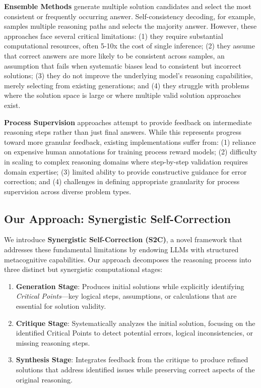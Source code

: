 \documentclass[10pt,twocolumn]{article}
\newcommand{\ssc}{\textsc{S2C}}
\begin{document}
\textbf{Ensemble Methods} generate multiple solution candidates and select the most consistent or frequently occurring answer. Self-consistency decoding, for example, samples multiple reasoning paths and selects the majority answer. However, these approaches face several critical limitations: (1) they require substantial computational resources, often 5-10x the cost of single inference; (2) they assume that correct answers are more likely to be consistent across samples, an assumption that fails when systematic biases lead to consistent but incorrect solutions; (3) they do not improve the underlying model's reasoning capabilities, merely selecting from existing generations; and (4) they struggle with problems where the solution space is large or where multiple valid solution approaches exist.

\textbf{Process Supervision} approaches attempt to provide feedback on intermediate reasoning steps rather than just final answers. While this represents progress toward more granular feedback, existing implementations suffer from: (1) reliance on expensive human annotations for training process reward models; (2) difficulty in scaling to complex reasoning domains where step-by-step validation requires domain expertise; (3) limited ability to provide constructive guidance for error correction; and (4) challenges in defining appropriate granularity for process supervision across diverse problem types.

\subsection{Our Approach: Synergistic Self-Correction}

We introduce \textbf{Synergistic Self-Correction (\ssc{})}, a novel framework that addresses these fundamental limitations by endowing LLMs with structured metacognitive capabilities. Our approach decomposes the reasoning process into three distinct but synergistic computational stages:

\begin{enumerate}
\item \textbf{Generation Stage}: Produces initial solutions while explicitly identifying \textit{Critical Points}—key logical steps, assumptions, or calculations that are essential for solution validity.

\item \textbf{Critique Stage}: Systematically analyzes the initial solution, focusing on the identified Critical Points to detect potential errors, logical inconsistencies, or missing reasoning steps.

\item \textbf{Synthesis Stage}: Integrates feedback from the critique to produce refined solutions that address identified issues while preserving correct aspects of the original reasoning.
\end{enumerate}
\end{document}
